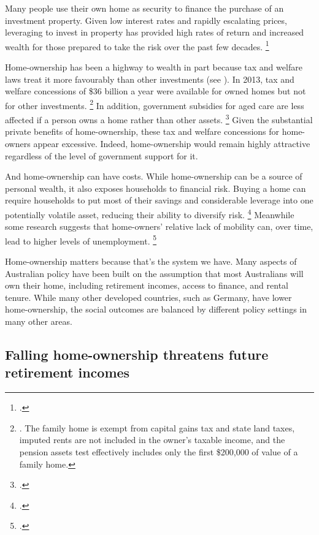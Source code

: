 Many people use their own home as security to finance the purchase of an investment property.
Given low interest rates and rapidly escalating prices, leveraging to invest in property has provided high rates of return and increased wealth for those prepared to take the risk over the past few decades.%
	\footcite{CrowleyLi2016}

Home-ownership has been a highway to wealth in part because tax and welfare laws treat it more favourably than other investments (see ).
In 2013, tax and welfare concessions of \$36 billion a year were available for owned homes but not for other investments.%
	\footnote{\textcite[][22--29]{KellyHarrisonHunterEtAl2013}.
	The family home is exempt from capital gains tax and state land taxes, imputed rents are not included in the owner's taxable income, and the pension assets test effectively includes only the first \$200,000 of value of a family home.}
In addition, government subsidies for aged care are less affected if a person owns a home rather than other assets.%
	\footcites{DSS-Exempting-Principal-Home-Care-situations}{OnePath-2013-Aged-care-and-the-former-home} 
Given the substantial private benefits of home-ownership, these tax and welfare concessions for home-owners appear excessive. 	Indeed, home-ownership would remain highly attractive regardless of the level of government support for it.

And home-ownership can have costs. While home-ownership can be a source of personal wealth, it also exposes households to financial risk. Buying a home can require households to put most of their savings and considerable leverage into one potentially volatile asset, reducing their ability to diversify risk.%
    \footcite[][8]{KellyHarrisonHunterEtAl2013}
Meanwhile some research suggests that home-owners' relative lack of mobility can, over time, lead to higher levels of unemployment.%
    \footcite[][8]{KellyHarrisonHunterEtAl2013}
    
Home-ownership matters because that's the system we have. Many aspects of Australian policy have been built on the assumption that most Australians will own their home, including retirement incomes, access to finance, and rental tenure. While many other developed countries, such as Germany, have lower home-ownership, the social outcomes are balanced by different policy settings in many other areas. 

\subsection{Falling home-ownership threatens future retirement incomes }\label{subsec:higher-housing-costs-and-falling-home-ownership-rates-threaten-future-retirement-incomes}

